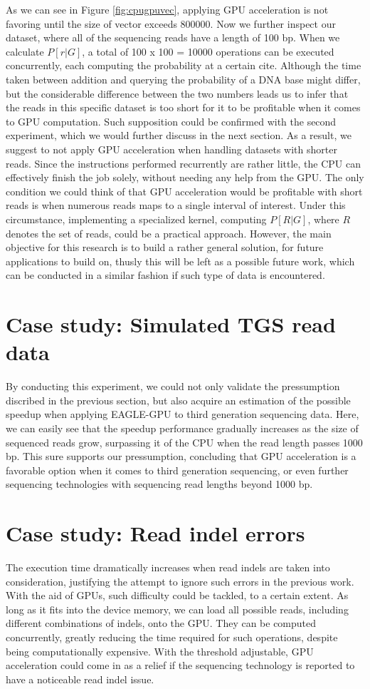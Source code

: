 \documentclass{PHlab-thesis}
\begin{document}
As we can see in Figure \ref{fig:cpugpuvec}, applying GPU acceleration is not favoring until the size of vector exceeds 800000. Now we further inspect our dataset, where all of the sequencing reads have a length of 100 bp. When we calculate $P[r|G]$, a total of 100 x 100 = 10000 operations can be executed concurrently, each computing the probability at a certain cite. Although the time taken between addition and querying the probability of a DNA base might differ, but the considerable difference between the two numbers leads us to infer that the reads in this specific dataset is too short for it to be profitable when it comes to GPU computation. Such supposition could be confirmed with the second experiment, which we would further discuss in the next section. As a result, we suggest to not apply GPU acceleration when handling datasets with shorter reads. Since the instructions performed recurrently are rather little, the CPU can effectively finish the job solely, without needing any help from the GPU. The only condition we could think of that GPU acceleration would be profitable with short reads is when numerous reads maps to a single interval of interest. Under this circumstance, implementing a specialized kernel, computing $P[R|G]$, where $R$ denotes the set of reads, could be a practical approach. However, the main objective for this research is to build a rather general solution, for future applications to build on, thusly this will be left as a possible future work, which can be conducted in a similar fashion if such type of data is encountered.

\section{Case study: Simulated TGS read data}
By conducting this experiment, we could not only validate the pressumption discribed in the previous section, but also acquire an estimation of the possible speedup when applying EAGLE-GPU to third generation sequencing data. Here, we can easily see that the speedup performance gradually increases as the size of sequenced reads grow, surpassing it of the CPU when the read length passes 1000 bp. This sure supports our pressumption, concluding that GPU acceleration is a favorable option when it comes to third generation sequencing, or even further sequencing technologies with sequencing read lengths beyond 1000 bp.

\section{Case study: Read indel errors}
The execution time dramatically increases when read indels are taken into consideration, justifying the attempt to ignore such errors in the previous work. With the aid of GPUs, such difficulty could be tackled, to a certain extent. As long as it fits into the device memory, we can load all possible reads, including different combinations of indels, onto the GPU. They can be computed concurrently, greatly reducing the time required for such operations, despite being computationally expensive. With the threshold adjustable, GPU acceleration could come in as a relief if the sequencing technology is reported to have a noticeable read indel issue.
\end{document}
